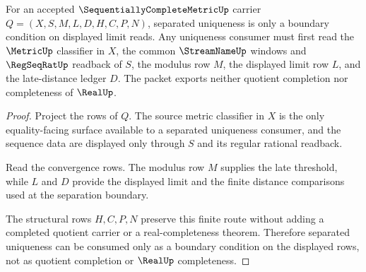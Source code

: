 \begin{theorem}
\label{thm:sequentially-complete-metric-separated-uniqueness-boundary}
For an accepted $\SequentiallyCompleteMetricUp$ carrier $Q=(X,S,M,L,D,H,C,P,N)$, separated uniqueness is only a boundary condition on displayed limit reads. Any uniqueness consumer must first read the $\MetricUp$ classifier in $X$, the common $\StreamNameUp$ windows and $\RegSeqRatUp$ readback of $S$, the modulus row $M$, the displayed limit row $L$, and the late-distance ledger $D$. The packet exports neither quotient completion nor completeness of $\RealUp$.
\end{theorem}
\begin{proof}
Project the rows of $Q$. The source metric classifier in $X$ is the only equality-facing surface available to a separated uniqueness consumer, and the sequence data are displayed only through $S$ and its regular rational readback.

Read the convergence rows. The modulus row $M$ supplies the late threshold, while $L$ and $D$ provide the displayed limit and the finite distance comparisons used at the separation boundary.

The structural rows $H,C,P,N$ preserve this finite route without adding a completed quotient carrier or a real-completeness theorem. Therefore separated uniqueness can be consumed only as a boundary condition on the displayed rows, not as quotient completion or $\RealUp$ completeness.
\end{proof}

